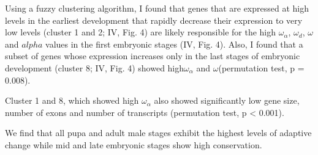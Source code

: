 Using a fuzzy clustering algorithm, I found that genes that are expressed at high levels in the earliest development that rapidly decrease their expression to very low levels (cluster 1 and 2; IV, Fig. 4) are likely responsible for the high $\omega_{\alpha}$, $\omega_{d}$, $\omega$ and $alpha$ values in the first embryonic stages (IV, Fig. 4).
Also, I found that a subset of genes whose expression increases only in the last stages of embryonic development  (cluster 8; IV, Fig. 4) showed high$\omega_{\alpha}$ and $\omega$(permutation test, p = 0.008).

Cluster 1 and 8, which showed high $\omega_{\alpha}$ also showed significantly low gene size, number of exons and number of transcripts (permutation test, p < 0.001).





We find that all pupa and adult male stages exhibit the highest levels of adaptive change while mid and late embryonic stages show high conservation. 

